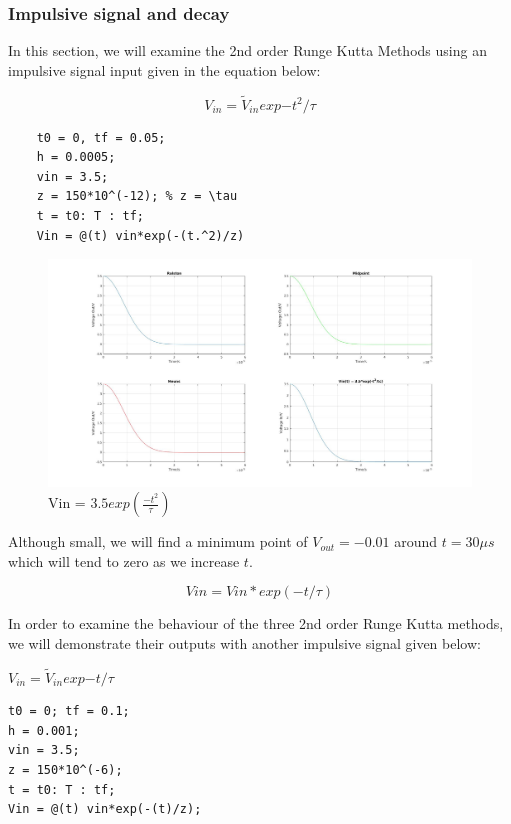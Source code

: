 \documentclass[11pt,a4paper]{article}
\begin{document}
\newpage
\subsubsection{Impulsive signal and decay}
In this section, we will examine the 2nd order Runge Kutta Methods using an impulsive signal input given in the equation below:

 \begin{equation}
V_{in} = \tilde{V}_{in}  exp{-t^2/\tau}
\end{equation}

 \begin{verbatim}
    t0 = 0, tf = 0.05;
    h = 0.0005;
    vin = 3.5;
    z = 150*10^(-12); % z = \tau
    t = t0: T : tf;
    Vin = @(t) vin*exp(-(t.^2)/z)
    \end{verbatim}

	\begin{figure}[h]
		\includegraphics[width=\textwidth]{Ex1_Figs/subt2.jpg}
		\vspace{-6mm}
		\caption{Vin = $3.5exp(\frac{-t^2}{\tau})$}
		\label{fig:RL3}
	\end{figure}


Although small, we will find a minimum point of $V_{out} = -0.01$ around $t = 30\mu s$ which will tend to zero as we increase $t$.
\newpage

\[Vin = Vin*exp(-t/\tau)\]

In order to examine the behaviour of the three 2nd order Runge Kutta methods, we will demonstrate their outputs with another impulsive signal given below:


$V_{in} = \tilde{V}_{in}  exp{-t/\tau}$

\begin{verbatim}
t0 = 0; tf = 0.1;
h = 0.001;
vin = 3.5;
z = 150*10^(-6);
t = t0: T : tf;
Vin = @(t) vin*exp(-(t)/z);
\end{verbatim}
\end{document}
